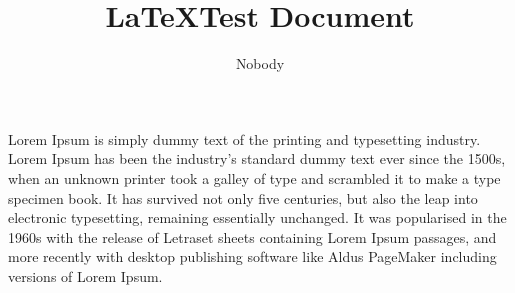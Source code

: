 \documentclass[12pt]{article}
\title{\LaTeX Test Document}
\author{Nobody}
\begin{document}
\maketitle
Lorem Ipsum is simply dummy text of the printing and typesetting industry. Lorem Ipsum has been the industry's standard dummy text ever since the 1500s, when an unknown printer took a galley of type and scrambled it to make a type specimen book. It has survived not only five centuries, but also the leap into electronic typesetting, remaining essentially unchanged. It was popularised in the 1960s with the release of Letraset sheets containing Lorem Ipsum passages, and more recently with desktop publishing software like Aldus PageMaker including versions of Lorem Ipsum.


\end{document}
